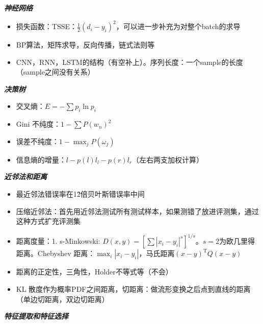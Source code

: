 \documentclass[UTF8,a4paper,landscape,compress]{paper}
\renewcommand{\section}[1]{{\normalsize\textbf{\emph{#1}}}\\ }
\newcommand{\List}[1]{\begin{itemize}[fullwidth,itemindent=0em] #1 \end{itemize}}
\begin{document}
\begin{multicols}{4}
\section{神经网络}
\List{
    \item {损失函数：TSSE：$\frac12(d_i - y_i)^2$，可以进一步补充为对整个batch的求导}
    \item {BP算法，矩阵求导，反向传播，链式法则等}
    \item {CNN，RNN，LSTM的结构（有空补上）。序列长度：一个sample的长度（sample之间没有关系）}
}
\section{决策树}
\List{
    \item {交叉熵：$E = -\sum p_i\ln p_i$}
    \item {Gini 不纯度：$1 - \sum P(w_n)^2$}
    \item {误差不纯度：$1 - \max_j P(\omega_j)$}
    \item {信息熵的增量：$l - p(l)l_l - p(r)l_r$（左右两支加权计算）}
}
\section{近邻法和距离}
\List{
    \item {最近邻法错误率在1\~2倍贝叶斯错误率中间}
    \item {压缩近邻法：首先用近邻法测试所有测试样本，如果测错了放进评测集，通过这种方式扩充评测集}
    \item {距离度量：1. s-Minkowski: $D(x,y) = [\sum|x_i - y_i|^s]^{1/s}$。$s=2$为欧几里得距离。Chebyshev 距离：$\max_i |x_i - y_i|$，马氏距离$(x - y) ^ {\mathrm T}Q(x - y)$}
    \item {距离的正定性，三角性，Holder不等式等（不会）}
    \item {KL 散度作为概率PDF之间距离，切距离：做流形变换之后点到直线的距离（单边切距离，双边切距离）}
}
\section{特征提取和特征选择}

\end{multicols}
\end{document}
